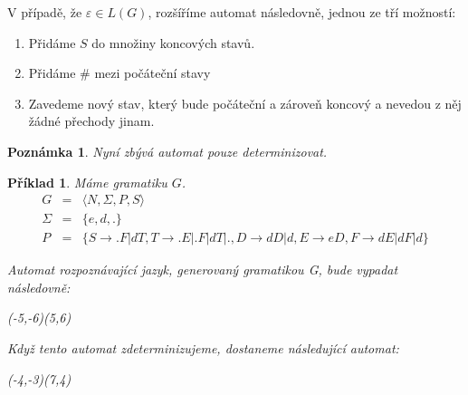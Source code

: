 \documentclass[10pt, a4paper, titlepage]{article}
\theoremstyle{note}
\newtheorem{priklad}{Příklad}
\newtheorem{poznamka}{Poznámka}
\begin{document}
V případě, že $\varepsilon \in L(G)$, rozšíříme automat následovně, jednou ze tří možností:
\begin{enumerate}
\item
Přidáme $S$ do množiny koncových stavů.

\item
Přidáme $\#$ mezi počáteční stavy

\item
Zavedeme nový stav, který bude počáteční a zároveň koncový a nevedou z něj žádné přechody jinam.
\end{enumerate}

\begin{poznamka}
Nyní zbývá automat pouze determinizovat.
\end{poznamka}

\begin{priklad}
Máme gramatiku $G$.
\begin{eqnarray*}
G &=& \langle N,\Sigma,P,S \rangle \\
\Sigma &=& \lbrace e,d,. \rbrace \\
P &=& \lbrace S \rightarrow .F | dT , T \rightarrow .E|.F|dT|. , D \rightarrow dD|d , E \rightarrow eD , F \rightarrow dE|dF|d \rbrace
\end{eqnarray*}

Automat rozpoznávající jazyk, generovaný gramatikou G, bude vypadat následovně:

\begin{center}
\begin{VCPicture}{(-5,-6)(5,6)}
\end{VCPicture}
\end{center}

Když tento automat zdeterminizujeme, dostaneme následující automat:

\begin{center}
\begin{VCPicture}{(-4,-3)(7,4)}
\end{VCPicture}
\end{center}

\end{priklad}
\end{document}

